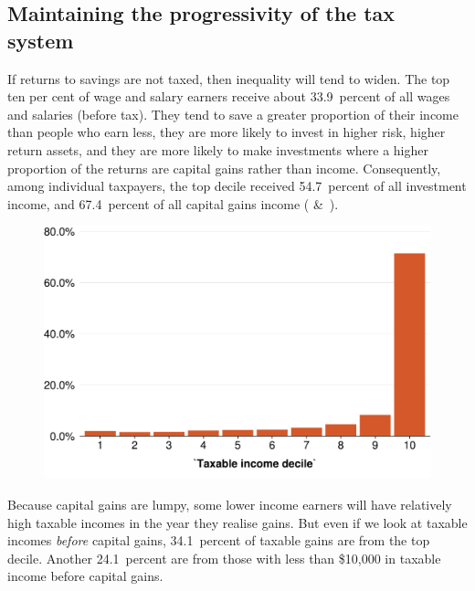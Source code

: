 \documentclass{grattan}\usepackage[]{graphicx}\usepackage[]{color}
\begin{document}
\subsection{Maintaining the progressivity of the tax system}\label{sec:maintaining-progressivity-tax-system}


If returns to savings are not taxed, then inequality will tend to widen. The top ten per cent of wage and salary earners receive about 33.9~percent of all wages and salaries (before tax). They tend to save a greater proportion of their income than people who earn less, they are more likely to invest in higher risk, higher return assets, and they are more likely to make investments where a higher proportion of the returns are capital gains rather than income.  Consequently, among individual taxpayers, the top decile received 54.7~percent of all investment income, and 67.4~percent of all capital gains income ( \&\ ). 

\begin{figure}

\includegraphics[width=\columnwidth]{CGT-NG-atlas//CG-by-decile-1}
\end{figure}



Because capital gains are lumpy, some lower income earners will have relatively high taxable incomes in the year they realise gains. But even if we look at taxable incomes \emph{before} capital gains, 34.1~percent of taxable gains are from the top decile. Another 24.1~percent are from those with less than \$10,000 in taxable income before capital gains.
\end{document}
